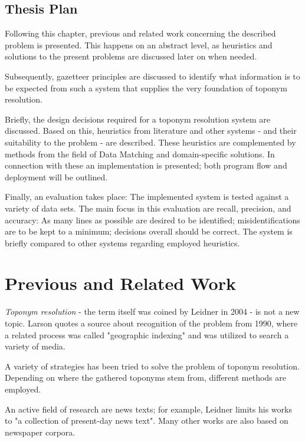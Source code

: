 \documentclass[11pt]{article}
\begin{document}
\subsection{Thesis Plan}
Following this chapter, previous and related work concerning the described problem is presented. This happens on an abstract level, as heuristics and solutions to the present problems are discussed later on when needed.

Subsequently, gazetteer principles are discussed to identify what information is to be expected from such a system that supplies the very foundation of toponym resolution.

Briefly, the design decisions required for a toponym resolution system are discussed. Based on this, heuristics from literature and other systems - and their suitability to the problem - are described. These heuristics are complemented by methods from the field of Data Matching and domain-specific solutions. In connection with these an implementation is presented; both program flow and deployment will be outlined.

Finally, an evaluation takes place: The implemented system is tested against a variety of data sets. The main focus in this evaluation are recall, precision, and accuracy: As many lines as possible are desired to be identified; misidentifications are to be kept to a minimum; decisions overall should be correct. The system is briefly compared to other systems regarding employed heuristics.

\section{Previous and Related Work}
\emph{Toponym resolution} - the term itself was coined by Leidner in 2004 \cite{leidner07} - is not a new topic. Larson quotes a source about recognition of the problem from 1990, where a related process was called "geographic indexing" and was utilized to search a variety of media. \cite{larson96}

A variety of strategies has been tried to solve the problem of toponym resolution. Depending on where the gathered toponyms stem from, different methods are employed.

An active field of research are news texts; for example, Leidner limits his works to "a collection of present-day news text". \cite{leidner07} Many other works are also based on newspaper corpora. \cite{brunner08}\cite{buscaldi10}\cite{buscaldi11}
\end{document}
